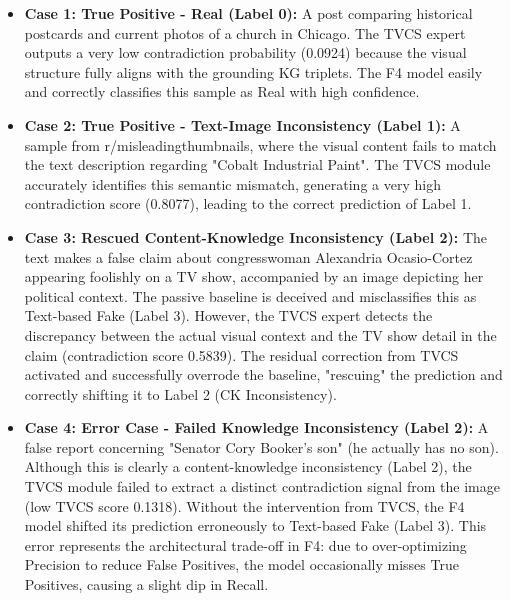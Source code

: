 \begin{itemize}
    \item \textbf{Case 1: True Positive - Real (Label 0):} A post comparing historical postcards and current photos of a church in Chicago. The TVCS expert outputs a very low contradiction probability (0.0924) because the visual structure fully aligns with the grounding KG triplets. The F4 model easily and correctly classifies this sample as Real with high confidence.
    \item \textbf{Case 2: True Positive - Text-Image Inconsistency (Label 1):} A sample from r/misleadingthumbnails, where the visual content fails to match the text description regarding "Cobalt Industrial Paint". The TVCS module accurately identifies this semantic mismatch, generating a very high contradiction score (0.8077), leading to the correct prediction of Label 1.
    \item \textbf{Case 3: Rescued Content-Knowledge Inconsistency (Label 2):} The text makes a false claim about congresswoman Alexandria Ocasio-Cortez appearing foolishly on a TV show, accompanied by an image depicting her political context. The passive baseline is deceived and misclassifies this as Text-based Fake (Label 3). However, the TVCS expert detects the discrepancy between the actual visual context and the TV show detail in the claim (contradiction score 0.5839). The residual correction from TVCS activated and successfully overrode the baseline, "rescuing" the prediction and correctly shifting it to Label 2 (CK Inconsistency).
    \item \textbf{Case 4: Error Case - Failed Knowledge Inconsistency (Label 2):} A false report concerning "Senator Cory Booker's son" (he actually has no son). Although this is clearly a content-knowledge inconsistency (Label 2), the TVCS module failed to extract a distinct contradiction signal from the image (low TVCS score 0.1318). Without the intervention from TVCS, the F4 model shifted its prediction erroneously to Text-based Fake (Label 3). This error represents the architectural trade-off in F4: due to over-optimizing Precision to reduce False Positives, the model occasionally misses True Positives, causing a slight dip in Recall.
\end{itemize}
